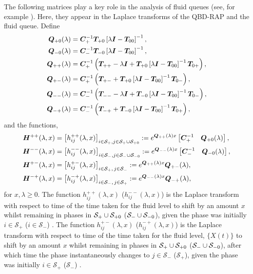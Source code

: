 The following matrices play a key role in the analysis of fluid queues (see, for example \cite{bean2009,dasilva2005}). Here, they appear in the Laplace transforms of the QBD-RAP and the fluid queue. Define 
\begin{align*}
	\boldsymbol Q_{+0}(\lambda) &= \boldsymbol C_+^{-1}\boldsymbol T_{+0}\left[\lambda \boldsymbol I - \boldsymbol T_{00}\right]^{-1},
	\\\boldsymbol Q_{-0}(\lambda) &= \boldsymbol C_-^{-1}\boldsymbol T_{-0}\left[\lambda \boldsymbol I - \boldsymbol T_{00}\right]^{-1},
	\\\boldsymbol Q_{++}(\lambda) &= \boldsymbol C_+^{-1} \left(\boldsymbol T_{++} - \lambda \boldsymbol I + \boldsymbol T_{+0}\left[\lambda \boldsymbol I - \boldsymbol T_{00}\right]^{-1}\boldsymbol T_{0+}\right),
	\\\boldsymbol Q_{+-}(\lambda) &= \boldsymbol C_+^{-1} \left(\boldsymbol T_{+-} + \boldsymbol T_{+0}\left[\lambda \boldsymbol I - \boldsymbol T_{00}\right]^{-1}\boldsymbol T_{0-} \right) ,
	\\\boldsymbol Q_{--}(\lambda) &= \boldsymbol C_-^{-1} \left(\boldsymbol T_{--}  - \lambda \boldsymbol I + \boldsymbol T_{-0}\left[\lambda \boldsymbol I - \boldsymbol T_{00}\right]^{-1}\boldsymbol T_{0-}\right),
	\\\boldsymbol Q_{-+}(\lambda) &=\boldsymbol C_-^{-1} \left(\boldsymbol T_{-+}+ \boldsymbol T_{-0}\left[\lambda \boldsymbol I - \boldsymbol T_{00}\right]^{-1}\boldsymbol T_{0+}\right) ,
\end{align*}
and the functions,
\begin{align}
	\boldsymbol H^{++}(\lambda,x)&= \left[h_{ij}^{++}(\lambda,x)\right]_{i\in \mathcal S_+,j\in\mathcal S_{+}\cup\mathcal{S}_{+0}} := e^{\boldsymbol{Q}_{++}(\lambda)x}\begin{bmatrix} \boldsymbol C_+^{-1} & \boldsymbol Q_{+0}(\lambda) \end{bmatrix},  \label{eqn: lst 1}
	\\\boldsymbol H^{--}(\lambda,x) &= \left[h_{ij}^{--}(\lambda,x)\right]_{i\in\mathcal S_-,j\in\mathcal S_{-}\cup\mathcal{S}_{-0}}:= e^{\boldsymbol{Q}_{--}(\lambda)x}\begin{bmatrix} \boldsymbol C_-^{-1} & \boldsymbol Q_{-0}(\lambda) \end{bmatrix},
	\\\boldsymbol H^{+-}(\lambda,x)  &= \left[h_{ij}^{+-}(\lambda,x)\right]_{i\in\mathcal S_+,\,j\in\mathcal S_-}:= e^{\boldsymbol{Q}_{++}(\lambda)x}\boldsymbol{Q}_{+-}(\lambda), 
	\\\boldsymbol H^{-+}(\lambda,x)&= \left[h_{ij}^{-+}(\lambda,x)\right]_{i\in\mathcal S_-,\, j\in\mathcal S_+} := e^{\boldsymbol{Q}_{--}(\lambda)x}\boldsymbol{Q}_{-+}(\lambda) , \label{eqn: lst 4}
\end{align}
for \(x,\lambda\geq 0\). The function \(h_{ij}^{++}(\lambda,x)\) (\(h_{ij}^{--}(\lambda,x)\)) is the Laplace transform with respect to time of the time taken for the fluid level to shift by an amount \(x\) whilst remaining in phases in \(\mathcal S_+\cup\mathcal{S}_{+0}\) (\(\mathcal S_-\cup\mathcal{S}_{-0}\)), given the phase was initially \(i\in\mathcal S_+\) (\(i\in\mathcal S_-\)) \citep{bean2005}. The function \(h_{ij}^{+-}(\lambda,x)\) (\(h_{ij}^{-+}(\lambda,x)\)) is the Laplace transform with respect to time of the time taken for the fluid level, \(\{X(t)\}\) to shift by an amount \(x\) whilst remaining in phases in \(\mathcal S_+\cup\mathcal{S}_{+0}\) (\(\mathcal S_-\cup\mathcal{S}_{-0}\)), after which time the phase instantaneously changes to \(j\in\mathcal S_-\) (\(\mathcal S_+\)), given the phase was initially \(i\in\mathcal S_+\) (\(\mathcal S_-\)) \citep{bean2005}.

